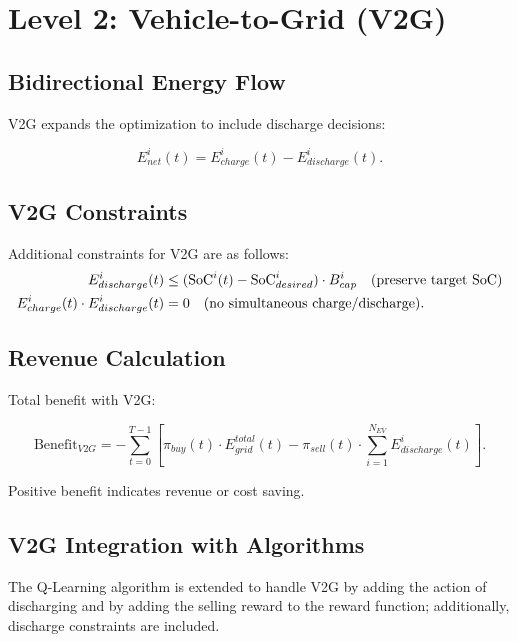 \section{Level 2: Vehicle-to-Grid (V2G)}
\label{sec:level3_model}

\subsection{Bidirectional Energy Flow}

V2G expands the optimization to include discharge decisions:

\begin{equation}
E_{net}^i(t) = E_{charge}^i(t) - E_{discharge}^i(t).
\end{equation}

\subsection{V2G Constraints}

Additional constraints for V2G are as follows:
\begin{align}
E_{discharge}^i(t) &\leq (\text{SoC}^i(t) - \text{SoC}_{desired}^i) \cdot B_{cap}^{i} \quad \text{(preserve target SoC)} \\
E_{charge}^i(t) \cdot E_{discharge}^i(t) &= 0 \quad \text{(no simultaneous charge/discharge)}.
\end{align}

\subsection{Revenue Calculation}

Total benefit with V2G:

\begin{equation}
\text{Benefit}_{V2G} = -\sum_{t=0}^{T-1} \left[ \pi_{buy}(t) \cdot E_{grid}^{total}(t) - \pi_{sell}(t) \cdot \sum_{i=1}^{N_{EV}} E_{discharge}^i(t) \right].
\end{equation}

Positive benefit indicates revenue or cost saving.

\subsection{V2G Integration with Algorithms}

The Q-Learning algorithm is extended to handle V2G by adding the action of discharging and by adding the selling reward to the reward function; additionally, discharge constraints are included.

